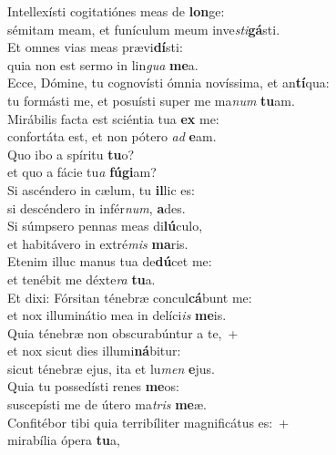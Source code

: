\evenverse Intellexísti cogitatiónes meas de \textbf{lon}ge:~\*\\
\evenverse sémitam meam, et funículum meum inve\textit{sti}\textbf{gá}sti.\\
\oddverse Et omnes vias meas prævi\textbf{dí}sti:~\*\\
\oddverse quia non est sermo in lin\textit{gua} \textbf{me}a.\\
\evenverse Ecce, Dómine, tu cognovísti ómnia novíssima, et an\textbf{tí}qua:~\*\\
\evenverse tu formásti me, et posuísti super me ma\textit{num} \textbf{tu}am.\\
\oddverse Mirábilis facta est sciéntia tua \textbf{ex} me:~\*\\
\oddverse confortáta est, et non pótero \textit{ad} \textbf{e}am.\\
\evenverse Quo ibo a spíritu \textbf{tu}o?~\*\\
\evenverse et quo a fácie tu\textit{a} \textbf{fú}\textbf{gi}am?\\
\oddverse Si ascéndero in cælum, tu \textbf{il}lic es:~\*\\
\oddverse si descéndero in infér\textit{num}, \textbf{a}des.\\
\evenverse Si súmpsero pennas meas di\textbf{lú}culo,~\*\\
\evenverse et habitávero in extré\textit{mis} \textbf{ma}ris.\\
\oddverse Etenim illuc manus tua de\textbf{dú}cet me:~\*\\
\oddverse et tenébit me déxte\textit{ra} \textbf{tu}a.\\
\evenverse Et dixi: Fórsitan ténebræ concul\textbf{cá}bunt me:~\*\\
\evenverse et nox illuminátio mea in delíci\textit{is} \textbf{me}is.\\
\oddverse Quia ténebræ non obscurabúntur a te,~+\\
\oddverse  et nox sicut dies illumi\textbf{ná}bitur:~\*\\
\oddverse sicut ténebræ ejus, ita et lu\textit{men} \textbf{e}jus.\\
\evenverse Quia tu possedísti renes \textbf{me}os:~\*\\
\evenverse suscepísti me de útero ma\textit{tris} \textbf{me}æ.\\
\oddverse Confitébor tibi quia terribíliter magnificátus es:~+\\
\oddverse  mirabília ópera \textbf{tu}a,~\*\\
